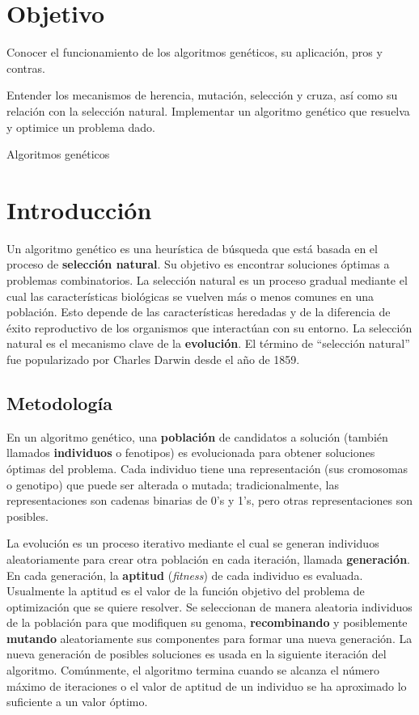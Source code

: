 \section{Objetivo}
Conocer el funcionamiento de los algoritmos genéticos, su aplicación, pros y contras.\par
Entender los mecanismos de herencia, mutación, selección y cruza, así como su relación con la selección natural.
Implementar un algoritmo genético que resuelva y optimice un problema dado.

\begin{auxcode}
 \caption{Algoritmos genéticos}
 \centering
\end{auxcode}

\section{Introducci\'on}

Un algoritmo genético es una heurística de búsqueda que está basada en el proceso de \textbf{selección natural}.  Su objetivo es encontrar soluciones óptimas a problemas combinatorios. La selección natural es un proceso gradual mediante el cual las características biológicas se vuelven más o menos comunes en una población. Esto depende de las características heredadas y de la diferencia de éxito reproductivo de los organismos que interactúan con su entorno. La selección natural es el mecanismo clave de la \textbf{evolución}. El término de “selección natural” fue popularizado por Charles Darwin desde el año de 1859.

\subsection{Metodolog\'ia}

En un algoritmo genético, una \textbf{población} de candidatos a solución (también llamados \textbf{individuos} o fenotipos) es evolucionada para obtener soluciones óptimas del problema. Cada individuo tiene una representación (sus cromosomas o genotipo) que puede ser alterada o mutada; tradicionalmente, las representaciones son cadenas binarias de 0’s y 1’s, pero otras representaciones son posibles.\par

La evolución es un proceso iterativo mediante el cual se generan individuos aleatoriamente para crear otra población en cada iteración, llamada \textbf{generación}. En cada generación, la \textbf{aptitud} (\textit{fitness}) de cada individuo es evaluada. Usualmente la aptitud es el valor de la función objetivo del problema de optimización que se quiere resolver. Se seleccionan de manera aleatoria individuos de la población para que modifiquen su genoma, \textbf{recombinando} y posiblemente \textbf{mutando} aleatoriamente sus componentes para formar una nueva generación. La nueva generación de posibles soluciones es usada en la siguiente iteración del algoritmo. Comúnmente, el algoritmo termina cuando se alcanza el número máximo de iteraciones o el valor de aptitud de un individuo se ha aproximado lo suficiente a un valor óptimo.

